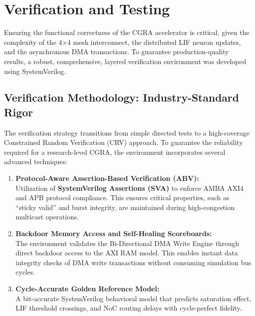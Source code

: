 \section{Verification and Testing}

Ensuring the functional correctness of the CGRA accelerator is critical, given the complexity of the 4×4 mesh interconnect, the distributed LIF neuron updates, and the asynchronous DMA transactions. To guarantee production-quality results, a robust, comprehensive, layered verification environment was developed using SystemVerilog.

\subsection{Verification Methodology: Industry-Standard Rigor}
The verification strategy transitions from simple directed tests to a high-coverage Constrained Random Verification (CRV) approach. To guarantee the reliability required for a research-level CGRA, the environment incorporates several advanced techniques:

\begin{enumerate}
    \item \textbf{Protocol-Aware Assertion-Based Verification (ABV):} \\
    Utilization of \textbf{SystemVerilog Assertions (SVA)} to enforce AMBA AXI4 and APB protocol compliance. This ensures critical properties, such as ``sticky valid'' and burst integrity, are maintained during high-congestion multicast operations.
    \item \textbf{Backdoor Memory Access and Self-Healing Scoreboards:} \\
    The environment validates the Bi-Directional DMA Write Engine through direct backdoor access to the AXI RAM model. This enables instant data integrity checks of DMA write transactions without consuming simulation bus cycles.
    \item \textbf{Cycle-Accurate Golden Reference Model:} \\
    A bit-accurate SystemVerilog behavioral model that predicts saturation effect, LIF threshold crossings, and NoC routing delays with cycle-perfect fidelity.
\end{enumerate}

